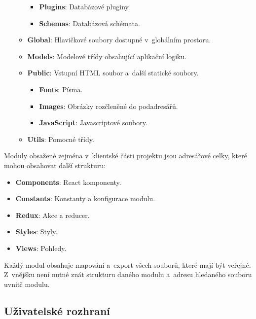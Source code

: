 \documentclass[a4paper,12pt]{article}
\begin{document}
\begin{itemize}
\begin{itemize}
\begin{itemize}
\item \textbf{Plugins}: Databázové pluginy.
\item \textbf{Schemas}: Databázová schémata.
\end{itemize} 

\item \textbf{Global}: Hlavičkové soubory dostupné v~globálním prostoru.
\item \textbf{Models}: Modelové třídy obsahující aplikační logiku.
\item \textbf{Public}: Vstupní HTML soubor a~další statické soubory.

\begin{itemize}
\item \textbf{Fonts}: Písma.
\item \textbf{Images}: Obrázky rozčleněné do podadresářů.
\item \textbf{JavaScript}: Javascriptové soubory.
\end{itemize} 

\item \textbf{Utils}:  Pomocné třídy.
\end{itemize} 

\end{itemize} 

Moduly obsažené zejména v~klientské části projektu jsou adresářové celky, které mohou obsahovat další strukturu:

\begin{itemize}
\item \textbf{Components}: React komponenty.
\item \textbf{Constants}: Konstanty a konfigurace modulu.
\item \textbf{Redux}: Akce a reducer.
\item \textbf{Styles}: Styly.
\item \textbf{Views}: Pohledy.
\end{itemize} 

Každý modul obsahuje mapování a~export všech souborů, které mají být veřejné. Z~vnějšku není nutné znát strukturu daného modulu a~adresu hledaného souboru uvnitř modulu.





\subsection{Uživatelské rozhraní}
\end{document}
